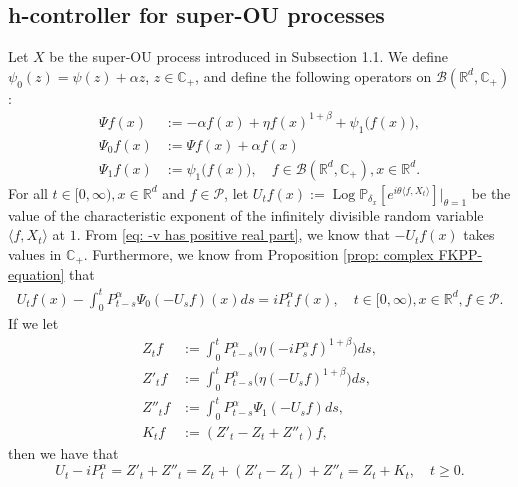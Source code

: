 \documentclass[12pt,a4paper]{amsart}
\theoremstyle{plain}
\theoremstyle{definition}
\numberwithin{equation}{section}
\begin{document}
\subsection{h-controller  for super-OU processes}
Let $X$ be the super-OU process introduced in Subsection 1.1. We define $\psi_0(z)=\psi(z)+\alpha z$, $z\in \mathbb{C}_+$, and define the following operators on $\mathcal{B}(\mathbb{R}^d,\mathbb{C}_+)$:
\begin{equation}\begin{split}
    \Psi f (x) &:= -\alpha f(x) + \eta f(x)^{1+\beta} + \psi_1\big(f(x)\big),
    \\\Psi_0 f(x) &:= \Psi f(x) + \alpha f(x)
    \\ \Psi_1 f(x) &:= \psi_1 \big(f(x)\big),
    \quad  f\in \mathcal B(\mathbb R^d, \mathbb C_+), x\in \mathbb R^d.
\end{split}\end{equation}
For all $t\in [0,\infty), x\in \mathbb R^d $ and $f \in \mathcal{P}$, 
let $U_tf(x) := \operatorname{Log} \mathbb P_{\delta_x}[e^{i\theta \langle f, X_t\rangle}]|_{\theta = 1}$ be 
the value of the characteristic exponent of the infinitely divisible random variable
$\langle f, X_t\rangle$ at $1$.
    From \eqref{eq: -v has positive real part}, we know that $-U_tf(x)$ takes values in $\mathbb C_+$. Furthermore, we know from Proposition \ref{prop: complex FKPP-equation} that
\begin{equation}\begin{split}
\label{eq:chareq2}
    U_tf(x)-\int_0^t P^\alpha_{t-s} \Psi_0(-U_sf)(x)ds
    =i P^{\alpha}_t f(x),
    \quad t\in [0,\infty), x\in \mathbb{R}^d, f\in \mathcal P.
\end{split}\end{equation}
If we  let
\begin{equation}\begin{split}
\label{eq: def of Zf}
    Z_t f
    &:= \int_0^t P^\alpha_{t-s}\big( \eta (-i P^\alpha_sf)^{1+\beta}\big)ds,
    \\ Z'_t f
    &:= \int_0^t P^\alpha_{t-s}\big( \eta (-U_s f)^{1+\beta}\big)ds,
    \\ Z''_t f
    &:= \int_0^t P^\alpha_{t-s}\Psi_1(-U_s f)ds,
    \\ K_t f
    &:= (Z'_t - Z_t+ Z''_t)f,
\end{split}\end{equation}
    then we have that
\[
    U_t - i P^\alpha_t
    = Z'_t + Z''_t
    = Z_t+ (Z'_t - Z_t) + Z''_t
    = Z_t+K_t, \quad t\geq 0.
\]
\end{document}
